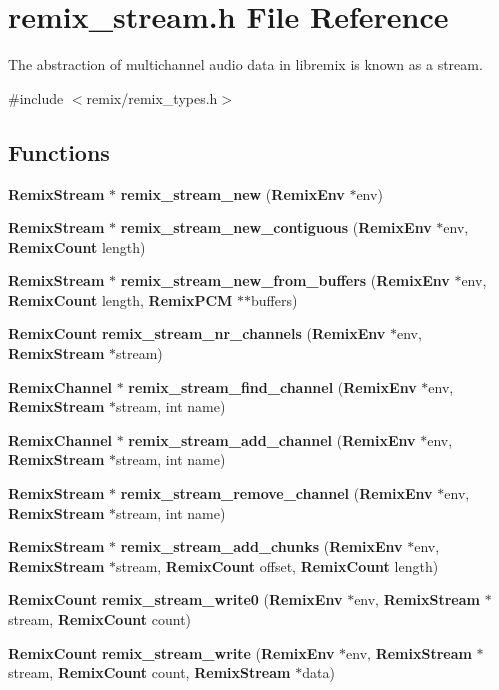 \section{remix\_\-stream.h File Reference}
\label{remix__stream_8h}


The abstraction of multichannel audio data in libremix is known as a stream.  


{\ttfamily \#include $<$remix/remix\_\-types.h$>$}\par
\subsection*{Functions}
\begin{DoxyCompactItemize}
\item 
{\bf RemixStream} $\ast$ {\bf remix\_\-stream\_\-new} ({\bf RemixEnv} $\ast$env)
\item 
{\bf RemixStream} $\ast$ {\bf remix\_\-stream\_\-new\_\-contiguous} ({\bf RemixEnv} $\ast$env, {\bf RemixCount} length)
\item 
{\bf RemixStream} $\ast$ {\bf remix\_\-stream\_\-new\_\-from\_\-buffers} ({\bf RemixEnv} $\ast$env, {\bf RemixCount} length, {\bf RemixPCM} $\ast$$\ast$buffers)
\item 
{\bf RemixCount} {\bf remix\_\-stream\_\-nr\_\-channels} ({\bf RemixEnv} $\ast$env, {\bf RemixStream} $\ast$stream)
\item 
{\bf RemixChannel} $\ast$ {\bf remix\_\-stream\_\-find\_\-channel} ({\bf RemixEnv} $\ast$env, {\bf RemixStream} $\ast$stream, int name)
\item 
{\bf RemixChannel} $\ast$ {\bf remix\_\-stream\_\-add\_\-channel} ({\bf RemixEnv} $\ast$env, {\bf RemixStream} $\ast$stream, int name)
\item 
{\bf RemixStream} $\ast$ {\bf remix\_\-stream\_\-remove\_\-channel} ({\bf RemixEnv} $\ast$env, {\bf RemixStream} $\ast$stream, int name)
\item 
{\bf RemixStream} $\ast$ {\bf remix\_\-stream\_\-add\_\-chunks} ({\bf RemixEnv} $\ast$env, {\bf RemixStream} $\ast$stream, {\bf RemixCount} offset, {\bf RemixCount} length)
\item 
{\bf RemixCount} {\bf remix\_\-stream\_\-write0} ({\bf RemixEnv} $\ast$env, {\bf RemixStream} $\ast$stream, {\bf RemixCount} count)
\item 
{\bf RemixCount} {\bf remix\_\-stream\_\-write} ({\bf RemixEnv} $\ast$env, {\bf RemixStream} $\ast$stream, {\bf RemixCount} count, {\bf RemixStream} $\ast$data)
$$
\end{DoxyCompactItemize}
